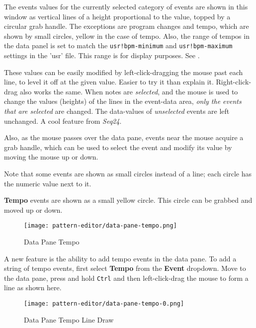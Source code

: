 \begin{itemize}
   The events values for the currently selected category of events are shown
   in this window as vertical lines of a height proportional to the value,
   topped by a circular grab handle.
   The exceptions are program changes and tempo, which are shown by small
   circles, yellow in the case of tempo.
   Also, the range of tempos in the data panel is set to match the
   \texttt{usr!bpm-minimum}
   and
   \texttt{usr!bpm-maximum}
   settings in the 'usr' file.
   This range is for display purposes.
   See .

   These values can be easily modified by
   left-click-dragging the
   mouse past each line, to level it off at the given value.
   Easier to try it than explain it.
   Right-click-drag also works the same.
   When notes are \textsl{selected}, and the
   mouse is used to change the values (heights) of the lines in the event-data
   area, \textsl{only the events that are selected} are changed.
   The data-values of \textsl{unselected} events are left unchanged.
   A cool feature from \textsl{Seq24}.

   Also, as the mouse passes over the data pane, events near the mouse
   acquire a grab handle, which can be used to select the event
   and modify its value by moving the mouse up or down.

   Note that some events are shown as small circles instead of a line; each
   circle has the numeric value next to it.

   \textbf{Tempo}
   events are shown as a small yellow circle.
   This circle can be grabbed and moved up or down.

\begin{figure}[H]
   \centering 
   \texttt{[image: pattern-editor/data-pane-tempo.png]}
   \caption{Data Pane Tempo}
   \label{fig:pattern_editor_data_pane_tempo}
\end{figure}

   A new feature is the ability to
   add tempo events in the data pane.
   To add a string of tempo events, first select \textbf{Tempo}
   from the \textbf{Event} dropdown.
   Move to the data pane, press and hold \texttt{Ctrl}
   and then left-click-drag the mouse to form a line
   as shown here.

\begin{figure}[H]
   \centering 
   \texttt{[image: pattern-editor/data-pane-tempo-0.png]}
   \caption{Data Pane Tempo Line Draw}
   \label{fig:pattern_editor_data_pane_tempo_line_draw}
\end{figure}


\end{itemize}
